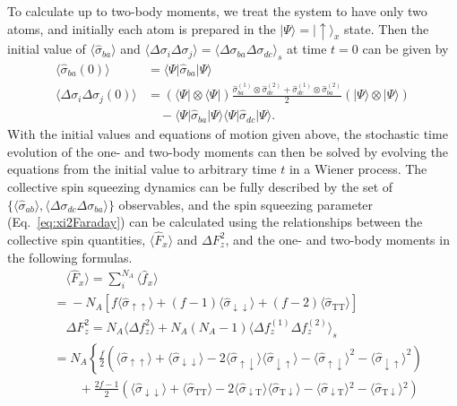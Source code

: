 \documentclass[aps,pra,twocolumn,superscriptaddress]{revtex4-1} %
\def\bra#1{\langle{#1}\rvert}%
\def\ket#1{\lvert{#1}\rangle}%
\newcommand{\nn}{\nonumber}
\newcommand{\expect}[1]{\big\langle #1 \big\rangle}
\newcommand{\sigmauu}{\hat{\sigma}_{\uparrow\uparrow}}
\newcommand{\sigmaud}{\hat{\sigma}_{\uparrow\downarrow}}
\newcommand{\sigmadu}{\hat{\sigma}_{\downarrow\uparrow}}
\newcommand{\sigmadd}{\hat{\sigma}_{\downarrow\downarrow}}
\newcommand{\sigmadt}{\hat{\sigma}_{\downarrow \mathrm{T}}}
\newcommand{\sigmatd}{\hat{\sigma}_{\mathrm{T}\downarrow}}
\newcommand{\sigmatt}{\hat{\sigma}_{\mathrm{T}\mathrm{T}}}
\begin{document}
\begin{appendix}
To calculate up to two-body moments, we treat the system to have only two atoms, and initially each atom is prepared in the $ \ket{\Psi}=\ket{\uparrow}_x $ state. Then the initial value of $ \expect{\hat{\sigma}_{ba} } $ and $ \expect{\Delta\sigma_i\Delta\sigma_j}=\expect{\Delta\sigma_{ba}\Delta\sigma_{dc}}_s $ at time $ t=0 $ can be given by
\begin{subequations}
\begin{align}
\expect{\hat{\sigma}_{ba}(0)}&=\bra{\Psi}\hat{\sigma}_{ba}\ket{\Psi}\\
\expect{\!\Delta\sigma\!_i\Delta\sigma\!_j(0)} &=\! (\bra{\Psi}\!\otimes\!\bra{\Psi})\frac{\hat{\sigma}_{ba}^{(\!1\!)} \!\otimes\!\hat{\sigma}_{dc}^{(\!2\!)}\!+\!\hat{\sigma}_{dc}^{(\!1\!)} \!\otimes\!\hat{\sigma}_{ba}^{(\!2\!)}}{2}(\ket{\Psi}\!\otimes\!\ket{\Psi}\!)\nn\\
&\quad-\bra{\Psi}\hat{\sigma}_{ba}\ket{\Psi}\bra{\Psi}\hat{\sigma}_{dc}\ket{\Psi}.
\end{align}
\end{subequations}
With the initial values and equations of motion given above, the stochastic time evolution of the one- and two-body moments can then be solved by evolving the equations from the initial value to arbitrary time $ t $ in a Wiener process. The collective spin squeezing dynamics can be fully described by the set of $ \{\expect{\hat{\sigma}_{ab}},\expect{\Delta\sigma_{dc}\Delta\sigma_{ba}}\} $ observables, and the spin squeezing parameter (Eq.~\eqref{eq:xi2Faraday}) can be calculated using the relationships between the collective spin quantities, $ \expect{\hat{F}_x} $ and $ \Delta F_z^2 $, and the one- and two-body moments in the following formulas.
\begin{subequations}
	\begin{align}
	&\quad \expect{\hat{F}_x} = \sum_i^{N_A}\expect{\hat{f}_x}\nonumber\\
	&= \!-N_A\! \left[f\expect{\!\sigmauu\!}\!+\!(f\!-\!1)\expect{\!\sigmadd\!}\!+\!(f\!-\!2)\expect{\!\sigmatt\! } \right]\label{eq:Fx_qutrit}\\
	&\quad\Delta F_z^2 = N_A\expect{\Delta f_z^2} + N_A(N_A-1)\expect{\Delta f_z^{(1)}\Delta f_z^{(2)} }_s\nn\\
	&=\!N_A\!\left\{\! \frac{f}{2}\!\left(\!\expect{\!\sigmauu\!}\!+\!\expect{\!\sigmadd}\!-\!2\expect{\!\sigmaud}\expect{\!\sigmadu\!}\!-\!\expect{\!\sigmaud}^2\!-\!\expect{\!\sigmadu\!}^2 \right)\right. \nn\\
	&\quad\quad+\! \frac{2f-1}{2}\!\!\left(\!\expect{\!\sigmadd}\!+\!\expect{\!\sigmatt\!}\!\!-\!2\expect{\!\sigmadt\!}\expect{\!\sigmatd}\!\!-\!\expect{\!\sigmadt\!}\!^2\!\!-\!\expect{\!\sigmatd}\!^2 \right)\nn\\

\end{align}
\end{subequations}
\end{appendix}
\end{document}
